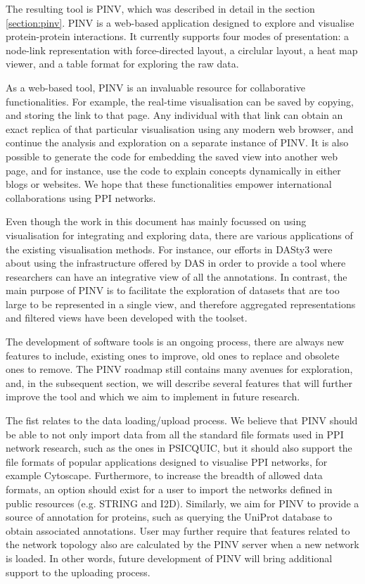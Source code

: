 The resulting tool is PINV, which was described in detail in the section \ref{section:pinv}. PINV is a web-based application designed to explore and visualise protein-protein interactions. It currently supports four modes of presentation: a node-link representation with force-directed layout, a circlular layout, a heat map viewer, and a table format for exploring the raw data. 

As a web-based tool, PINV is an invaluable resource for collaborative functionalities. For example, the real-time visualisation can be saved by copying, and storing the link to that page. Any individual with that link can obtain an exact replica of that particular visualisation using any modern web browser, and continue the analysis and exploration on a separate instance of PINV. It is also possible to generate the code for embedding the saved view into another web page, and for instance, use the code to explain concepts dynamically  in either blogs or websites. We hope that these functionalities empower international collaborations using PPI networks.

Even though the work in this document has mainly focussed on using visualisation for integrating and exploring data, there are various applications of the existing visualisation methods. For instance, our efforts in DASty3 were about using the infrastructure offered by DAS in order to provide a tool where researchers can have an integrative view of all the annotations. In contrast, the main purpose of PINV is to facilitate the exploration of datasets that are too large to be represented in a single view, and therefore aggregated representations and filtered views have been developed with the toolset.

The development of software tools is an ongoing process, there are always new features to include, existing ones to improve, old ones to replace and obsolete ones to remove. The PINV roadmap still contains many avenues for exploration, and, in the subsequent section, we will describe several features that will further improve the tool and which we aim to implement in future research.

The fist relates to the data loading/upload process. We believe that PINV should be able to not only import data from all the standard file formats used in PPI network research, such as the ones in PSICQUIC, but it should also support the file formats of popular applications designed to visualise PPI networks, for example Cytoscape. Furthermore, to increase the breadth of allowed data formats, an option should exist for a user to import the networks defined in public resources (e.g. STRING and I2D). Similarly, we aim for PINV to provide a source of annotation for proteins, such as querying the UniProt database to obtain associated annotations. User may further require that features related to the network topology also are calculated by the PINV server when a new network is loaded. In other words, future development of PINV will bring additional support to the uploading process.

